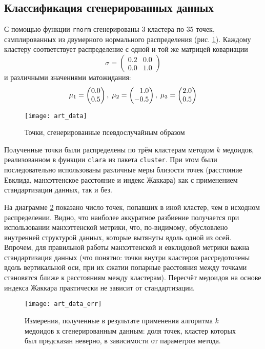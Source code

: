 \documentclass[a4paper,12pt]{article} %
\newcommand{\myPictWidth}{.95\textwidth}
\newcommand{\phm}{\phantom{-}}
\begin{document}
\newpage
\subsection{Классификация сгенерированных данных}

С помощью функции \texttt{rnorm} сгенерированы $ 3 $ кластера по $ 35 $ точек, сэмплированных из двумерного нормального распределения (рис. \ref{fig:art_data}). Каждому кластеру соответствует распределение с одной и той же матрицей ковариации
$$ \sigma =
\begin{pmatrix}
    0.2 & 0.0 \\
    0.0 & 1.0 \end{pmatrix} $$
  и различными значениями матожидания:
$$ \mu_1 = \begin{pmatrix} 0.0 \\ 0.5 \end{pmatrix}, \thickspace
  \mu_2 = \begin{pmatrix} \phm 1.0 \\ -0.5 \end{pmatrix}, \thickspace
  \mu_3 = \begin{pmatrix} 2.0 \\ 0.5 \end{pmatrix} $$

\begin{figure}[H]
    \centering \texttt{[image: art\_data]}
    \caption{Точки, сгенерированные псевдослучайным образом}
    \label{fig:art_data}
\end{figure}

Полученные точки были распределены по трём кластерам методом $ k $ медоидов, реализованном в функции \texttt{clara} из пакета \texttt{cluster}. При этом были последовательно использованы различные меры близости точек (расстояние Евклида, манхэттенское расстояние и индекс Жаккара) как с применением стандартизации данных, так и без.

На диаграмме \ref{fig:art_data_err} показано число точек, попавших в иной кластер, чем в исходном распределении. Видно, что наиболее аккуратное разбиение получается при использовании манхэттенской метрики, что, по-видимому, обусловлено внутренней структурой данных, которые вытянуты вдоль одной из осей. Впрочем, для правильной работы манхэттенской и евклидовой метрики важна стандартизация данных (что понятно: точки внутри кластеров рассредоточены вдоль вертикальной оси, при их сжатии попарные расстояния между точками становятся ближе к расстояниям между кластерам). Пересчёт медоидов на основе индекса Жаккара практически не зависит от стандартизации.
\begin{figure}[H]
    \centering \texttt{[image: art\_data\_err]}
    \caption{Измерения, полученные в результате применения алгоритма $ k $ медоидов к сгенерированным данным: доля точек, кластер которых был предсказан неверно, в зависимости от параметров метода.}
    \label{fig:art_data_err}
\end{figure}
\end{document}
